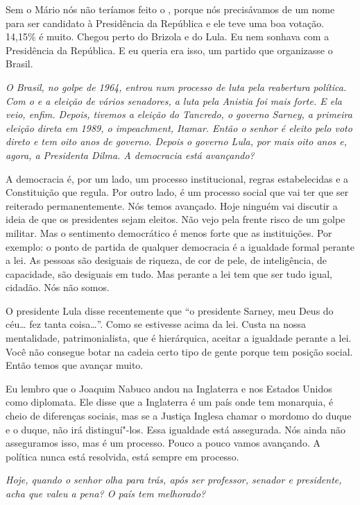 Sem o Mário nós não teríamos feito o , porque nós precisávamos de um
nome para ser candidato à Presidência da República e ele teve uma boa
votação. 14,15\% é muito. Chegou perto do Brizola e do Lula. Eu nem
sonhava com a Presidência da República. E eu queria era isso, um partido
que organizasse o Brasil.

\medskip

\noindent\emph{O Brasil, no golpe de 1964, entrou num processo de luta pela
reabertura política. Com o  e a eleição de vários senadores, a luta
pela Anistia foi mais forte. E ela veio, enfim. Depois, tivemos a
eleição do Tancredo, o governo Sarney, a primeira eleição direta em
1989, o impeachment, Itamar. Então o senhor é eleito pelo voto direto e
tem oito anos de governo. Depois o governo Lula, por mais oito anos e,
agora, a Presidenta Dilma. A democracia está avançando?}

A democracia é, por um lado, um processo institucional,
regras estabelecidas e a Constituição que regula. Por outro lado, é um
processo social que vai ter que ser reiterado permanentemente. Nós temos
avançado. Hoje ninguém vai discutir a ideia de que os presidentes sejam
eleitos. Não vejo pela frente risco de um golpe militar. Mas o
sentimento democrático é menos forte que as instituições. Por exemplo: o
ponto de partida de qualquer democracia é a igualdade formal perante a
lei. As pessoas são desiguais de riqueza, de cor de pele, de
inteligência, de capacidade, são desiguais em tudo. Mas perante a lei
tem que ser tudo igual, cidadão. Nós não somos.

O presidente Lula disse recentemente que ``o presidente Sarney, meu Deus
do céu\ldots{} fez tanta coisa\ldots{}''. Como se estivesse acima da lei. Custa na
nossa mentalidade, patrimonialista, que é hierárquica, aceitar a
igualdade perante a lei. Você não consegue botar na cadeia certo tipo de
gente porque tem posição social. Então temos que avançar muito.

Eu lembro que o Joaquim Nabuco andou na Inglaterra e nos Estados Unidos
como diplomata. Ele disse que a Inglaterra é um país onde tem monarquia,
é cheio de diferenças sociais, mas se a Justiça Inglesa chamar o mordomo
do duque e o duque, não irá distinguí"-los. Essa igualdade está
assegurada. Nós ainda não asseguramos isso, mas é um processo. Pouco a
pouco vamos avançando. A política nunca está resolvida, está sempre em
processo.

\medskip

\noindent\emph{Hoje, quando o senhor olha para trás, após ser professor,
senador e presidente, acha que valeu a pena? O país tem melhorado?}

